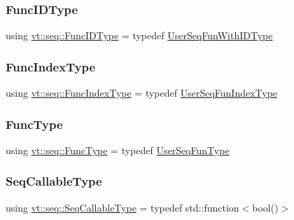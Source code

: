 \mbox{\label{namespacevt_1_1seq_a228aa2c36a3564f50232a32a8b4ff866}} 
\subsubsection{\texorpdfstring{Func\+I\+D\+Type}{FuncIDType}}
{\footnotesize\ttfamily using \hyperlink{namespacevt_1_1seq_a228aa2c36a3564f50232a32a8b4ff866}{vt\+::seq\+::\+Func\+I\+D\+Type} = typedef \hyperlink{namespacevt_1_1seq_a1a58d0ebe1d6bbed8438607a9c717779}{User\+Seq\+Fun\+With\+I\+D\+Type}}

\mbox{\label{namespacevt_1_1seq_a822a80f3859b6840e7114128a06ac197}} 
\subsubsection{\texorpdfstring{Func\+Index\+Type}{FuncIndexType}}
{\footnotesize\ttfamily using \hyperlink{namespacevt_1_1seq_a822a80f3859b6840e7114128a06ac197}{vt\+::seq\+::\+Func\+Index\+Type} = typedef \hyperlink{namespacevt_1_1seq_ab8466502cdb46b9f1d17e3e5630ed65a}{User\+Seq\+Fun\+Index\+Type}}

\mbox{\label{namespacevt_1_1seq_a26c632e5cbf02395a8bbd9aa4c761232}} 
\subsubsection{\texorpdfstring{Func\+Type}{FuncType}}
{\footnotesize\ttfamily using \hyperlink{namespacevt_1_1seq_a26c632e5cbf02395a8bbd9aa4c761232}{vt\+::seq\+::\+Func\+Type} = typedef \hyperlink{namespacevt_1_1seq_aeb4674d25dcb5d27248b68ec83fad2b6}{User\+Seq\+Fun\+Type}}

\mbox{\label{namespacevt_1_1seq_ab8c5e0c5aec2bd712a2b57e2e4553de6}} 
\subsubsection{\texorpdfstring{Seq\+Callable\+Type}{SeqCallableType}}
{\footnotesize\ttfamily using \hyperlink{namespacevt_1_1seq_ab8c5e0c5aec2bd712a2b57e2e4553de6}{vt\+::seq\+::\+Seq\+Callable\+Type} = typedef std\+::function$<$bool()$>$}

